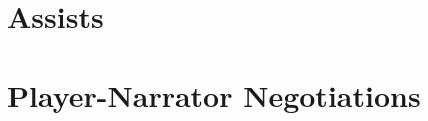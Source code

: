 \newpage
\chapter{Assists} \label{ch:hp_assists}


\newpage
\chapter{Player-Narrator Negotiations} \label{ch:hp_player_narrator_negotiations}


%
%

%


